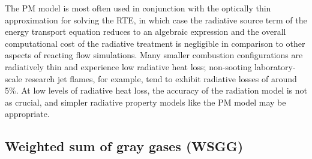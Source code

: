 \documentclass[preprint,12pt]{elsarticle}
\begin{document}
The PM model is most often used in conjunction with the optically thin approximation for solving the RTE, in which case the radiative source term of the energy transport equation reduces to an algebraic expression and the overall computational cost of the radiative treatment is negligible in comparison to other aspects of reacting flow simulations. Many smaller combustion configurations are radiatively thin and experience low radiative heat loss; non-sooting laboratory-scale research jet flames, for example, tend to exhibit radiative losses of around 5\%. At low levels of radiative heat loss, the accuracy of the radiation model is not as crucial, and simpler radiative property models like the PM model may be appropriate.


\subsection{Weighted sum of gray gases (WSGG)} \label{s:wsgg}
\end{document}
